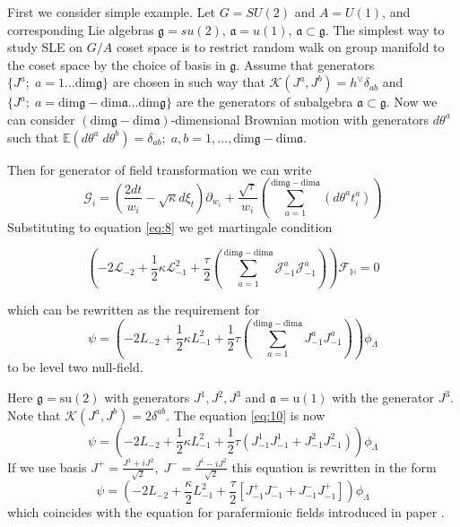 \documentclass[a4paper]{jpconf}
\theoremstyle{definition}
\newcommand{\gf}{\mathfrak{g}}
\newcommand{\af}{\mathfrak{a}}
\theoremstyle{definition} \newtheorem{Def}{Definition}
\begin{document}
First we consider simple example. Let $G=SU(2)$ and $A=U(1)$, and corresponding Lie algebras $\gf=su(2)$, $\af=u(1)$, $\af\subset\gf$.
The simplest way to study SLE on $G/A$ coset space is to restrict random walk on group manifold to the coset space by the choice of basis in $\gf$. Assume that generators $\{J^{a};\; a=1\dots \mathrm{dim}\gf\}$ are chosen in such way that $\mathcal{K}(J^{a},J^{b})=h^{\vee}\delta_{ab}$ and $\{J^{a};\; a=\mathrm{dim}\gf-\mathrm{dim}\af\dots \mathrm{dim}\gf\}$ are the generators of subalgebra $\af\subset \gf$. Now we can consider $(\mathrm{dim}\gf-\mathrm{dim}\af)$-dimensional Brownian motion with generators $d\theta^{a}$ such that $\mathbb{E}(d\theta^{a} \; d\theta^{b})=\delta_{ab};\; a,b=1,\dots,\mathrm{dim}\gf-\mathrm{dim}\af$.

Then for generator of field transformation we can write 
\begin{equation}
  \mathcal{G}_{i}=\left(\frac{2dt}{w_{i}}-\sqrt{\kappa} d\xi_{t}\right) \partial_{w_{i}}+\frac{\sqrt{\tau}}{w_{i}}\left(\sum_{a=1}^{\mathrm{dim}\gf-\mathrm{dim}\af}\left(d \theta ^{a} t^{a}_{i}\right)\right)
\label{eq:5}
\end{equation}
Substituting to equation \eqref{eq:8} we get martingale condition

\begin{equation}
  \left(-2 \mathcal{L}_{-2}+\frac{1}{2}\kappa \mathcal{L}_{-1}^{2}+\frac{\tau}{2}\left( \sum_{a=1}^{\mathrm{dim}\gf-\mathrm{dim}\af} \mathcal{J}^{a}_{-1} \mathcal{J}^{a}_{-1}\right)\right)        \mathcal{F}_{\mathbb{H}}=0
\label{eq:9}
\end{equation}

which can be rewritten as the requirement for
\begin{equation}
  \psi=\left(-2L_{-2}+\frac{1}{2}\kappa L_{-1}^{2}+\frac{1}{2}\tau \left(\sum_{a=1}^{\mathrm{dim}\gf-\mathrm{dim}\af}J^{a}_{-1}J^{a}_{-1}\right)\right) \phi_{\Lambda}
\label{eq:10}
\end{equation}
to be level two null-field. 

Here $\gf=\mathrm{su}(2)$ with generators $J^{1},J^{2},J^{3}$ and $\af=\mathrm{u}(1)$ with the generator $J^{3}$. Note that $\mathcal{K}(J^{a},J^{b})=2\delta^{ab}$. The equation \eqref{eq:10} is now
\begin{equation}
  \label{eq:11}
  \psi=\left(-2L_{-2}+\frac{1}{2}\kappa L_{-1}^{2}+\frac{1}{2}\tau \left(J^{1}_{-1}J^{1}_{-1}+J^{2}_{-1}J^{2}_{-1}\right)\right) \phi_{\Lambda}
\end{equation}
If we use basis $J^{+}=\frac{J^{1}+iJ^{2}}{\sqrt{2}},\; J^{-}=\frac{J^{1}-iJ^{2}}{\sqrt{2}}$ this equation is rewritten in the form
\begin{equation}
 \psi= \left(-2 L_{-2}+\frac{\kappa}{2}L_{-1}^{2}+\frac{\tau}{2}\left[J^{+}_{-1}J^{-}_{-1}+J^{-}_{-1}J^{+}_{-1}\right]\right) \phi_{\Lambda}
\label{eq:12}
\end{equation}
which coincides with the equation for parafermionic fields introduced in paper \cite{santachiara2008sle}.
\end{document}
